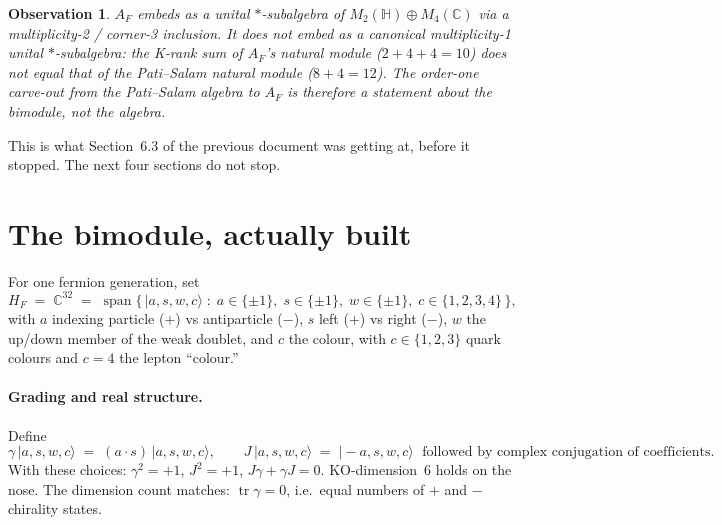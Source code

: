 \documentclass[11pt,a4paper]{article}
\newtheorem{observation}[theorem]{Observation}
\begin{document}
\begin{observation}\label{obs:embedding-corrected}
$A_F$ embeds as a unital $*$-subalgebra of $M_2(\mathbb{H}) \oplus M_4(\mathbb{C})$
via a multiplicity-2 / corner-3 inclusion. It does not embed as a canonical
multiplicity-1 unital $*$-subalgebra: the K-rank sum of $A_F$'s natural module
($2 + 4 + 4 = 10$) does not equal that of the Pati--Salam natural module
($8 + 4 = 12$). The order-one carve-out from the Pati--Salam algebra to $A_F$
is therefore a statement about the bimodule, not the algebra.
\end{observation}

This is what Section~6.3 of the previous document was getting at, before it
stopped. The next four sections do not stop.

\section{The bimodule, actually built}\label{sec:bimodule}

For one fermion generation, set
\[
  H_F \;=\; \mathbb{C}^{32}
       \;=\; \operatorname{span} \big\{\,|a, s, w, c\rangle \;:\;
              a \in \{\pm 1\},\; s \in \{\pm 1\},\;
              w \in \{\pm 1\},\; c \in \{1,2,3,4\}\,\big\},
\]
with $a$ indexing particle ($+$) vs antiparticle ($-$), $s$ left ($+$) vs right
($-$), $w$ the up/down member of the weak doublet, and $c$ the colour, with
$c \in \{1,2,3\}$ quark colours and $c = 4$ the lepton ``colour.''

\paragraph{Grading and real structure.}
Define
\[
  \gamma\, |a, s, w, c\rangle \;=\; (a \cdot s)\, |a, s, w, c\rangle,
  \qquad
  J\, |a, s, w, c\rangle \;=\; |\!-\!a, s, w, c\rangle
  \;\text{ followed by complex conjugation of coefficients.}
\]
With these choices: $\gamma^2 = +1$, $J^2 = +1$, $J\gamma + \gamma J = 0$.
KO-dimension~6 holds on the nose. The dimension count matches:
$\operatorname{tr}\gamma = 0$, i.e.\ equal numbers of $+$ and $-$ chirality states.
\end{document}
